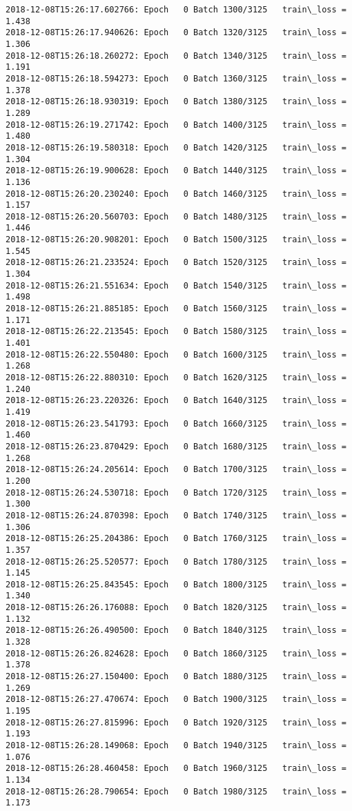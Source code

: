 \documentclass[11pt]{article}
\begin{document}
\begin{Verbatim}[commandchars=\\\{\}]
2018-12-08T15:26:17.602766: Epoch   0 Batch 1300/3125   train\_loss = 1.438
2018-12-08T15:26:17.940626: Epoch   0 Batch 1320/3125   train\_loss = 1.306
2018-12-08T15:26:18.260272: Epoch   0 Batch 1340/3125   train\_loss = 1.191
2018-12-08T15:26:18.594273: Epoch   0 Batch 1360/3125   train\_loss = 1.378
2018-12-08T15:26:18.930319: Epoch   0 Batch 1380/3125   train\_loss = 1.289
2018-12-08T15:26:19.271742: Epoch   0 Batch 1400/3125   train\_loss = 1.480
2018-12-08T15:26:19.580318: Epoch   0 Batch 1420/3125   train\_loss = 1.304
2018-12-08T15:26:19.900628: Epoch   0 Batch 1440/3125   train\_loss = 1.136
2018-12-08T15:26:20.230240: Epoch   0 Batch 1460/3125   train\_loss = 1.157
2018-12-08T15:26:20.560703: Epoch   0 Batch 1480/3125   train\_loss = 1.446
2018-12-08T15:26:20.908201: Epoch   0 Batch 1500/3125   train\_loss = 1.545
2018-12-08T15:26:21.233524: Epoch   0 Batch 1520/3125   train\_loss = 1.304
2018-12-08T15:26:21.551634: Epoch   0 Batch 1540/3125   train\_loss = 1.498
2018-12-08T15:26:21.885185: Epoch   0 Batch 1560/3125   train\_loss = 1.171
2018-12-08T15:26:22.213545: Epoch   0 Batch 1580/3125   train\_loss = 1.401
2018-12-08T15:26:22.550480: Epoch   0 Batch 1600/3125   train\_loss = 1.268
2018-12-08T15:26:22.880310: Epoch   0 Batch 1620/3125   train\_loss = 1.240
2018-12-08T15:26:23.220326: Epoch   0 Batch 1640/3125   train\_loss = 1.419
2018-12-08T15:26:23.541793: Epoch   0 Batch 1660/3125   train\_loss = 1.460
2018-12-08T15:26:23.870429: Epoch   0 Batch 1680/3125   train\_loss = 1.268
2018-12-08T15:26:24.205614: Epoch   0 Batch 1700/3125   train\_loss = 1.200
2018-12-08T15:26:24.530718: Epoch   0 Batch 1720/3125   train\_loss = 1.300
2018-12-08T15:26:24.870398: Epoch   0 Batch 1740/3125   train\_loss = 1.306
2018-12-08T15:26:25.204386: Epoch   0 Batch 1760/3125   train\_loss = 1.357
2018-12-08T15:26:25.520577: Epoch   0 Batch 1780/3125   train\_loss = 1.145
2018-12-08T15:26:25.843545: Epoch   0 Batch 1800/3125   train\_loss = 1.340
2018-12-08T15:26:26.176088: Epoch   0 Batch 1820/3125   train\_loss = 1.132
2018-12-08T15:26:26.490500: Epoch   0 Batch 1840/3125   train\_loss = 1.328
2018-12-08T15:26:26.824628: Epoch   0 Batch 1860/3125   train\_loss = 1.378
2018-12-08T15:26:27.150400: Epoch   0 Batch 1880/3125   train\_loss = 1.269
2018-12-08T15:26:27.470674: Epoch   0 Batch 1900/3125   train\_loss = 1.195
2018-12-08T15:26:27.815996: Epoch   0 Batch 1920/3125   train\_loss = 1.193
2018-12-08T15:26:28.149068: Epoch   0 Batch 1940/3125   train\_loss = 1.076
2018-12-08T15:26:28.460458: Epoch   0 Batch 1960/3125   train\_loss = 1.134
2018-12-08T15:26:28.790654: Epoch   0 Batch 1980/3125   train\_loss = 1.173

\end{Verbatim}
\end{document}
